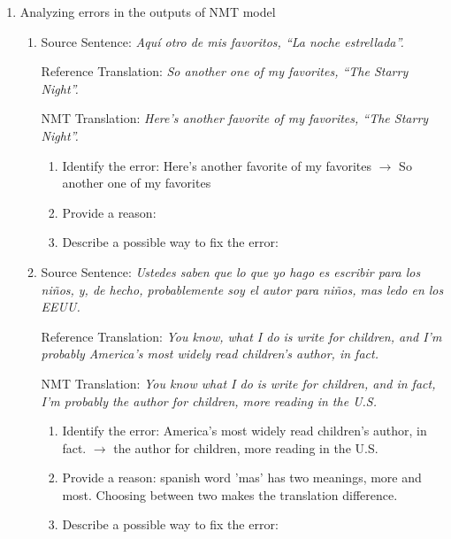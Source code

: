 \documentclass[a4paper]{article}
\begin{document}
    \begin{enumerate}[label=(\alph*)]
        \setcounter{enumi}{0} 
        \item Analyzing errors in the outputs of NMT model
        
        \begin{enumerate}[label=\roman*.]
            \item
            Source Sentence: \textit{Aquí otro de mis favoritos, “La noche estrellada”.} 

            Reference Translation: \textit{So another one of my favorites, “The Starry Night”.}

            NMT Translation: \textit{Here’s another favorite of my favorites, “The Starry Night”.}

            \begin{enumerate}[label=\arabic*.]
                \item Identify the error: Here’s another favorite of my favorites $\rightarrow$ So another one of my favorites
                \item Provide a reason: 
                \item Describe a possible way to fix the error: 
            \end{enumerate}
            
            \item
            Source Sentence: \textit{Ustedes saben que lo que yo hago es escribir para los niños, y, de hecho, probablemente soy el autor para niños, mas ledo en los EEUU.}

            Reference Translation: \textit{You know, what I do is write for children, and I’m probably America’s most widely read children’s author, in fact.}
            
            NMT Translation: \textit{You know what I do is write for children, and in fact, I’m probably the author for children, more reading in the U.S.}
            
            \begin{enumerate}[label=\arabic*.]
                \item Identify the error: America’s most widely read children’s author, in fact. $\rightarrow$ the author for children, more reading in the U.S.
                \item Provide a reason: spanish word 'mas' has two meanings, more and most. Choosing between two makes the translation difference.
                \item Describe a possible way to fix the error: 
            \end{enumerate}
            

\end{enumerate}
\end{enumerate}
\end{document}
